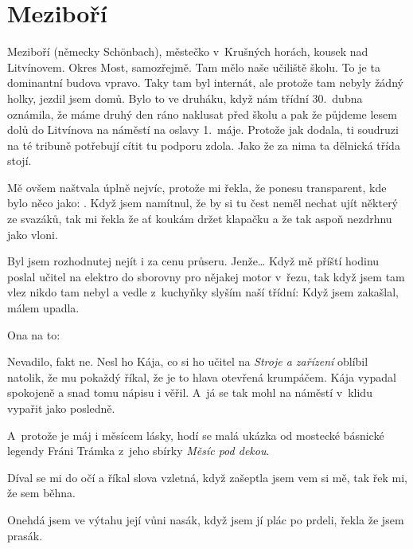 

\chapter{Meziboří}


Meziboří (německy Schönbach), městečko v~Krušných horách, kousek nad
Litvínovem. Okres Most, samozřejmě. Tam mělo naše učiliště školu. To je ta
dominantní budova vpravo. Taky tam byl internát, ale protože tam nebyly žádný
holky, jezdil jsem domů. Bylo to ve druháku, když nám třídní 30.~dubna
oznámila, že máme druhý den ráno naklusat před školu a pak že půjdeme lesem
dolů do Litvínova na náměstí na oslavy 1.~máje. Protože jak dodala, ti soudruzi
na té tribuně potřebují cítit tu podporu zdola. Jako že za nima ta dělnická
třída stojí.

Mě ovšem naštvala úplně nejvíc, protože mi řekla, že ponesu transparent, kde
bylo něco jako: .
Když jsem namítnul, že by si tu čest neměl nechat ujít některý ze svazáků, tak
mi řekla že ať koukám držet klapačku a že tak aspoň nezdrhnu jako vloni.

Byl jsem rozhodnutej nejít i za cenu průseru. Jenže\dots{} Když mě příští
hodinu poslal učitel na elektro do sborovny pro nějakej motor v~řezu, tak když
jsem tam vlez nikdo tam nebyl a vedle z~kuchyňky slyším naší třídní:
 Když jsem zakašlal,
málem upadla.

 Ona na to: 

Nevadilo, fakt ne. Nesl ho Kája, co si ho učitel na {\em Stroje a zařízení}
oblíbil natolik, že mu pokaždý říkal, že je to hlava otevřená krumpáčem. Kája
vypadal spokojeně a snad tomu nápisu i věřil. A~já se tak mohl na náměstí
v~klidu vypařit jako posledně.

A~protože je máj i měsícem lásky, hodí se malá ukázka od mostecké
básnické legendy Fráni Trámka z~jeho sbírky {\em Měsíc pod dekou}.

\blank[1em]

\no Díval se mi do očí \crlf
a říkal slova vzletná, \crlf
když zašeptla jsem vem si mě, \crlf
tak řek mi, že sem běhna. \crlf

\no Onehdá jsem ve výtahu \crlf
její vůni nasák, \crlf
když jsem jí plác po prdeli, \crlf
řekla že jsem prasák. \crlf

